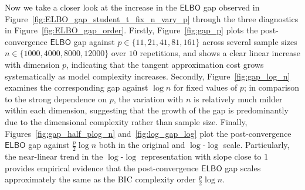 \documentclass[12pt]{article}
\numberwithin{equation}{section}
\begin{document}
Now we take a closer look at the increase in the $\mathsf{ELBO}$ gap observed in Figure~\ref{fig:ELBO_gap_student_t_fix_n_vary_p} through the three diagnostics in Figure~\ref{fig:ELBO_gap_order}. Firstly, Figure~\ref{fig:gap_p} plots the post-convergence $\mathsf{ELBO}$ gap against $p\in \{11, 21, 41, 81, 161\}$ across several sample sizes $n\in \{1000, 4000, 8000, 12000\}$ over $10$ repetitions, and shows a clear linear increase with dimension $p$, indicating that the tangent approximation cost grows systematically as model complexity increases. Secondly, Figure~\ref{fig:gap_log_n} examines the corresponding gap against $\log n$ for fixed values of $p$; in comparison to the strong dependence on $p$, the variation with $n$ is relatively much milder within each dimension, suggesting that the growth of the gap is predominantly due to the dimensional complexity rather than sample size. Finally, Figures~\ref{fig:gap_half_plog_n} and~\ref{fig:log_gap_log} plot the post-convergence $\mathsf{ELBO}$ gap against $\tfrac{p}{2}\log n$ both in the original and $\log$-$\log$ scale. Particularly, the near-linear trend in the $\log$-$\log$ representation with slope close to $1$ provides empirical evidence that the post-convergence $\mathsf{ELBO}$ gap scales approximately the same as the BIC complexity order $\tfrac{p}{2}\log n$.
\end{document}
